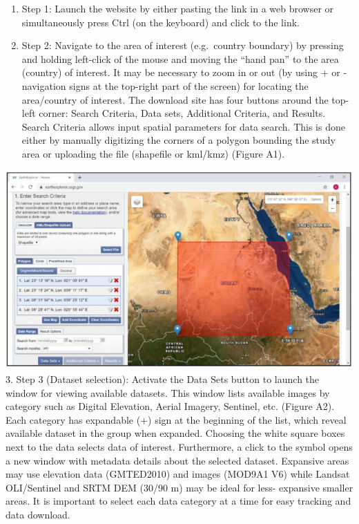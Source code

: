 \documentclass[
  10pt,
  b5paper,
]{book}
\providecommand{\tightlist}{%
  \setlength{\itemsep}{0pt}\setlength{\parskip}{0pt}}
\begin{document}
\begin{enumerate}
\def\labelenumi{\arabic{enumi}.}
\tightlist
\item
  Step 1: Launch the website by either pasting the link in a web browser or simultaneously press Ctrl
  (on the keyboard) and click to the link.
\item
  Step 2: Navigate to the area of interest (e.g.~country boundary) by pressing and holding left-click of the mouse and moving the ``hand pan'' to the area (country) of interest. It may be necessary to zoom in or out (by using + or - navigation signs at the top-right part of the screen) for locating the area/country of interest. The download site has four buttons around the top-left corner: Search Criteria, Data sets, Additional Criteria, and Results. Search Criteria allows input spatial parameters for data search. This is done either by manually digitizing the corners of a polygon bounding the study area or uploading the file (shapefile or kml/kmz) (Figure A1).
\end{enumerate}

\includegraphics{figures/images/Figure8.1.png}
3. Step 3 (Dataset selection): Activate the Data Sets button to launch the window for viewing available datasets. This window lists available images by category such as Digital Elevation, Aerial Imagery, Sentinel, etc. (Figure A2). Each category has expandable (+) sign at the beginning of the list, which reveal available dataset in the group when expanded. Choosing the white square boxes next to the data selects data of interest. Furthermore, a click to the symbol opens a new window with metadata details about the selected dataset. Expansive areas may use elevation data (GMTED2010) and images (MOD9A1 V6) while Landsat OLI/Sentinel and SRTM DEM (30/90 m) may be ideal for less- expansive smaller areas. It is important to select each data category at a time for easy tracking and data download.
\end{document}
